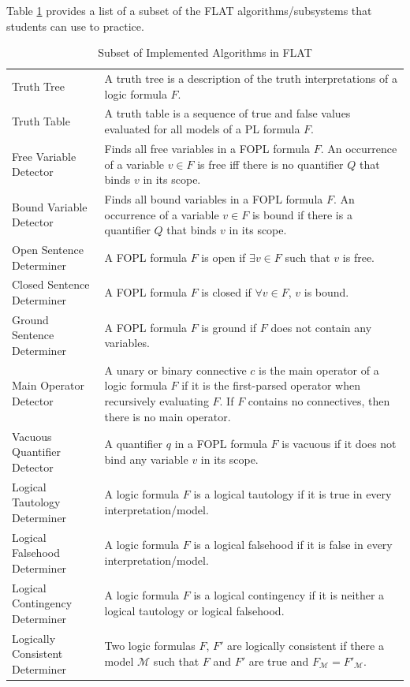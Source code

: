 \documentclass[ms]{uncgdissertationexp2}
\theoremstyle{plain}
\theoremstyle{definition}
\theoremstyle{remark}
\begin{document}
Table \ref{table:flat} provides a list of a subset of the FLAT algorithms/subsystems that students can use to practice.

\begin{table}
	\caption{Subset of Implemented Algorithms in FLAT}
	\label{table:flat}
	\small
	\begin{tabular}{p{3cm}p{11cm}}
	  \toprule
	  \thead{Algorithm}&\thead{Definition}\\
	  \midrule
	  Truth Tree&A truth tree is a description of the truth interpretations of a logic formula $F$.\\
	  Truth Table&A truth table is a sequence of true and false values evaluated for all models of a PL formula $F$.\\
	  Free Variable Detector&Finds all free variables in a FOPL formula $F$. An occurrence of a variable $v \in F$ is free iff there is no quantifier $Q$ that binds $v$ in its scope.\\
	  Bound Variable Detector&Finds all bound variables in a FOPL formula $F$. An occurrence of a variable $v \in F$ is bound if there is a quantifier $Q$ that binds $v$ in its scope.\\
	  Open Sentence Determiner&A FOPL formula $F$ is open if $\exists{v} \in F$ such that $v$ is free.\\
	  Closed Sentence Determiner&A FOPL formula $F$ is closed if $\forall{v} \in F$, $v$ is bound.\\
	  Ground Sentence Determiner&A FOPL formula $F$ is ground if $F$ does not contain any variables.\\
	  Main Operator Detector&A unary or binary connective $c$ is the main operator of a logic formula $F$ if it is the first-parsed operator when recursively evaluating $F$. If $F$ contains no connectives, then there is no main operator.\\
	  Vacuous Quantifier Detector&A quantifier $q$ in a FOPL formula $F$ is vacuous if it does not bind any variable $v$ in its scope.\\
	  Logical Tautology Determiner&A logic formula $F$ is a logical tautology if it is true in every interpretation/model.\\
	  Logical Falsehood Determiner&A logic formula $F$ is a logical falsehood if it is false in every interpretation/model.\\
	  Logical Contingency Determiner&A logic formula $F$ is a logical contingency if it is neither a logical tautology or logical falsehood.\\
	  Logically Consistent Determiner&Two logic formulas $F$, $F'$ are logically consistent if there a model $\mathcal{M}$ such that $F$ and $F'$ are true and $F_{\mathcal{M}} = F'_{\mathcal{M}}.$\\

\end{tabular}
\end{table}
\end{document}
